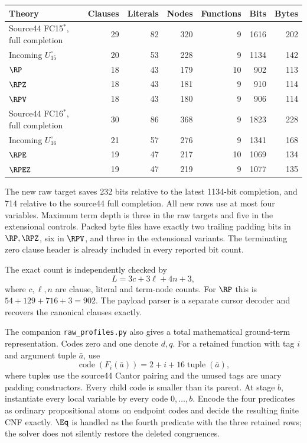 \begin{center}\small
\begin{tabular}{lrrrrrr}
\toprule
Theory & Clauses & Literals & Nodes & Functions & Bits & Bytes\\
\midrule
Source44 FC15$^*$, full completion &29&82&320&9&1616&202\\
Incoming $U_{15}^{\circ}$ &20&53&228&9&1134&142\\
$\RP$ &18&43&179&10&902&113\\
$\RPZ$ &18&43&181&9&910&114\\
$\RPV$ &18&43&180&9&906&114\\
\midrule
Source44 FC16$^*$, full completion &30&86&368&9&1823&228\\
Incoming $U_{16}^{\circ}$ &21&57&276&9&1341&168\\
$\RPE$ &19&47&217&10&1069&134\\
$\RPEZ$ &19&47&219&9&1077&135\\
\bottomrule
\end{tabular}
\end{center}
The new raw target saves 232 bits relative to the latest 1134-bit
completion, and 714 relative to the source44 full completion. All new
rows use at most four variables. Maximum term depth is three in the
raw targets and five in the extensional controls. Packed byte files
have exactly two trailing padding bits in $\RP,\RPZ$, six in $\RPV$,
and three in the extensional variants. The terminating zero clause header is already
included in every reported bit count.

The exact count is independently checked by
\[
 L=3c+3\ell+4n+3,
\]
where $c,\ell,n$ are clause, literal and term-node counts. For $\RP$
this is $54+129+716+3=902$. The payload parser is a separate cursor
decoder and recovers the canonical clauses exactly.

The companion \texttt{raw\_profiles.py} also gives a total mathematical
ground-term representation. Codes zero and one denote $d,q$. For a
retained function with tag $i$ and argument tuple $\bar a$, use
\[
 \operatorname{code}(F_i(\bar a))=2+i+16\operatorname{tuple}(\bar a),
\]
where tuples use the source44 Cantor pairing and the unused tags are
unary padding constructors. Every child code is smaller than its
parent. At stage $b$, instantiate every local variable by every code
$0,\ldots,b$. Encode the four predicates as ordinary propositional
atoms on endpoint codes and decide the resulting finite CNF exactly.
$\Eq$ is handled as the fourth predicate with the three retained rows;
the solver does not silently restore the deleted congruences.

